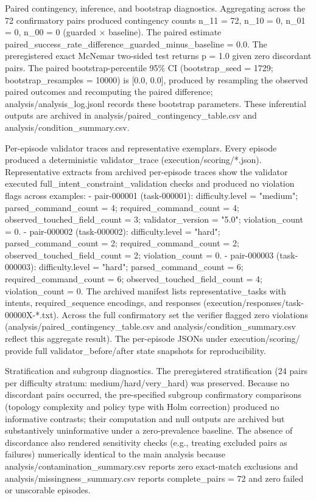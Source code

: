 \documentclass[conference]{IEEEtran}
\begin{document}
Paired contingency, inference, and bootstrap diagnostics. Aggregating across the 72 confirmatory pairs produced contingency counts n\_11 = 72, n\_10 = 0, n\_01 = 0, n\_00 = 0 (guarded \ensuremath{\times} baseline). The paired estimate paired\_success\_rate\_difference\_guarded\_minus\_baseline = 0.0. The preregistered exact McNemar two-sided test returns p = 1.0 given zero discordant pairs. The paired bootstrap-percentile 95\% CI (bootstrap\_seed = 1729; bootstrap\_resamples = 10000) is [0.0, 0.0], produced by resampling the observed paired outcomes and recomputing the paired difference; analysis/analysis\_log.jsonl records these bootstrap parameters. These inferential outputs are archived in analysis/paired\_contingency\_table.csv and analysis/condition\_summary.csv.

Per-episode validator traces and representative exemplars. Every episode produced a deterministic validator\_trace (execution/scoring/*.json). Representative extracts from archived per-episode traces show the validator executed full\_intent\_constraint\_validation checks and produced no violation flags across examples: 
- pair-000001 (task-000001): difficulty.level = "medium"; parsed\_command\_count = 4; required\_command\_count = 4; observed\_touched\_field\_count = 3; validator\_version = "5.0"; violation\_count = 0.
- pair-000002 (task-000002): difficulty.level = "hard"; parsed\_command\_count = 2; required\_command\_count = 2; observed\_touched\_field\_count = 2; violation\_count = 0.
- pair-000003 (task-000003): difficulty.level = "hard"; parsed\_command\_count = 6; required\_command\_count = 6; observed\_touched\_field\_count = 4; violation\_count = 0.
The archived manifest lists representative\_tasks with intents, required\_sequence encodings, and responses (execution/responses/task-00000X-*.txt). Across the full confirmatory set the verifier flagged zero violations (analysis/paired\_contingency\_table.csv and analysis/condition\_summary.csv reflect this aggregate result). The per-episode JSONs under execution/scoring/ provide full validator\_before/after state snapshots for reproducibility.

Stratification and subgroup diagnostics. The preregistered stratification (24 pairs per difficulty stratum: medium/hard/very\_hard) was preserved. Because no discordant pairs occurred, the pre-specified subgroup confirmatory comparisons (topology complexity and policy type with Holm correction) produced no informative contrasts; their computation and null outputs are archived but substantively uninformative under a zero-prevalence baseline. The absence of discordance also rendered sensitivity checks (e.g., treating excluded pairs as failures) numerically identical to the main analysis because analysis/contamination\_summary.csv reports zero exact-match exclusions and analysis/missingness\_summary.csv reports complete\_pairs = 72 and zero failed or unscorable episodes.
\end{document}

